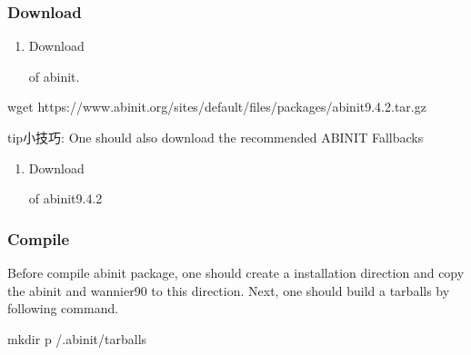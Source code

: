 \documentclass[a4paper,12pt,english]{sphinxmanual}
\begin{document}
\subsubsection{Download}
\label{\detokenize{compile/abinit_9.4.2:download}}\begin{enumerate}
%
\item {} 
\sphinxAtStartPar
Download %
\begin{footnote}[19]\sphinxAtStartFootnote
{}
%
\end{footnote} of abinit.

\end{enumerate}

\begin{sphinxVerbatim}[commandchars=\\\{\}]
wget https://www.abinit.org/sites/default/files/packages/abinit\PYGZhy{}9.4.2.tar.gz
\end{sphinxVerbatim}

\begin{sphinxadmonition}{tip}{小技巧:}
\sphinxAtStartPar
One should also download the recommended ABINIT Fallbacks
\end{sphinxadmonition}
\begin{enumerate}
%
\item {} 
\sphinxAtStartPar
Download %
\begin{footnote}[20]\sphinxAtStartFootnote
{}
%
\end{footnote} of abinit\sphinxhyphen{}9.4.2

\end{enumerate}


\subsubsection{Compile}
\label{\detokenize{compile/abinit_9.4.2:compile}}
\sphinxAtStartPar
Before compile abinit package, one should create a installation direction and copy the abinit and wannier90 to this direction. Next, one should build a tarballs by following command.

\begin{sphinxVerbatim}[commandchars=\\\{\}]
mkdir \PYGZhy{}p \PYGZti{}/.abinit/tarballs
\end{sphinxVerbatim}
\end{document}
